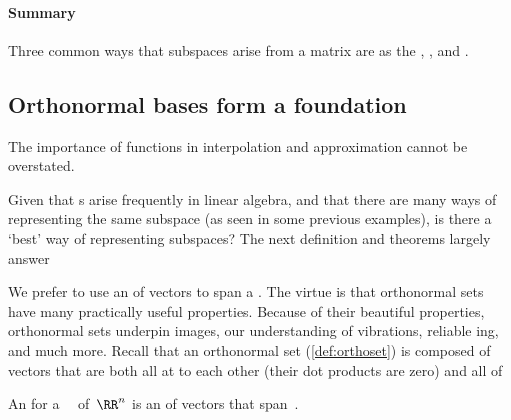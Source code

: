 \paragraph{Summary} Three common ways that subspaces arise from a matrix are as the , , and .








\subsection{Orthonormal bases form a foundation}
\label{sec:obff}


\begin{quoted}{\cite{Cuyt2015}}%
The importance of  functions in interpolation and approximation cannot be overstated.  
\end{quoted}

Given that s arise frequently in linear algebra, and that there are many ways of representing the same subspace (as seen in some previous examples), is there a `best' way of representing subspaces?
The next definition and theorems largely answer 

We prefer to use an  of vectors to span a .
The virtue is that orthonormal sets have many practically useful properties.
Because of their beautiful properties, orthonormal sets underpin \textsc{} images, our understanding of vibrations, reliable ing, and much more.
Recall that an orthonormal set (\cref{def:orthoset}) is composed of vectors that are both all at  to each other (their dot products are zero) and all of 


\begin{definition} \label{def:orthobasis} 
An  for a ~\WW\ of~\(\RR^n\) is an  of vectors that span~\WW.
\end{definition}


